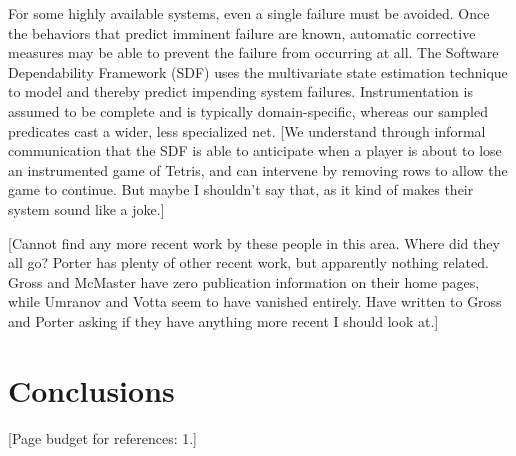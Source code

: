 \documentclass{acm_proc_article-sp}
\newcommand{\placeholder}[1]{{\color[cmyk]{0,0.61,0.87,0}[#1]}}
\begin{document}
For some highly available systems, even a single failure must be
avoided.  Once the behaviors that predict imminent failure are known,
automatic corrective measures may be able to prevent the failure from
occurring at all.  The Software Dependability Framework (SDF)
\cite{Gross:2003:PSMUST} uses the multivariate state estimation
technique to model and thereby predict impending system failures.
Instrumentation is assumed to be complete and is typically
domain-specific, whereas our sampled predicates cast a wider, less
specialized net.  \placeholder{We understand through informal
  communication that the SDF is able to anticipate when a player is
  about to lose an instrumented game of Tetris, and can intervene by
  removing rows to allow the game to continue.  But maybe I shouldn't
  say that, as it kind of makes their system sound like a joke.}

\placeholder{Cannot find any more recent work by these people in this
  area.  Where did they all go?  Porter has plenty of other recent
  work, but apparently nothing related.  Gross and McMaster have zero
  publication information on their home pages, while Umranov and Votta
  seem to have vanished entirely.  Have written to Gross and Porter
  asking if they have anything more recent I should look at.}

\section{Conclusions}
\label{sec:conclusions}


\placeholder{Page budget for references: 1.}
\end{document}
